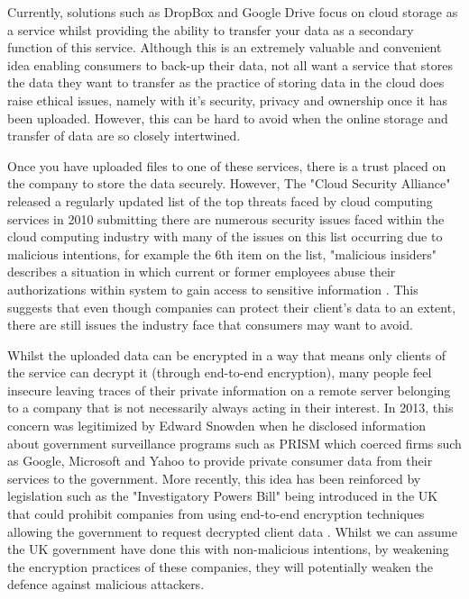 \documentclass[]{report}
\begin{document}
			Currently, solutions such as DropBox and Google Drive focus on cloud storage as a service whilst providing the ability to transfer your data as a secondary function of this service. Although this is an extremely valuable and convenient idea enabling consumers to back-up their data, not all want a service that stores the data they want to transfer as the practice of storing data in the cloud does raise ethical issues, namely with it's security, privacy and ownership once it has been uploaded. However, this can be hard to avoid when the online storage and transfer of data are so closely intertwined.
			
			Once you have uploaded files to one of these services, there is a trust placed on the company to store the data securely. However, The "Cloud Security Alliance" released a regularly updated list of the top threats faced by cloud computing services in 2010 submitting there are numerous security issues faced within the cloud computing industry with many of the issues on this list occurring due to malicious intentions, for example the 6th item on the list, "malicious insiders" describes a situation in which current or former employees abuse their authorizations within system to gain access to sensitive information \cite{CSA Top Threats}. This suggests that even though companies can protect their client's data to an extent, there are still issues the industry face that consumers may want to avoid.
		 
		 	Whilst the uploaded data can be encrypted in a way that means only clients of the service can decrypt it (through end-to-end encryption), many people feel insecure leaving traces of their private information on a remote server belonging to a company that is not necessarily always acting in their interest. In 2013, this concern was legitimized by Edward Snowden when he disclosed information about government surveillance programs such as PRISM which coerced firms such as Google, Microsoft and Yahoo to provide private consumer data from their services to the government.\cite{PRISM}  More recently, this idea has been reinforced by legislation such as the "Investigatory Powers Bill" being introduced in the UK that could prohibit companies from using end-to-end encryption techniques allowing the government to request decrypted client data \cite{IPB Encryption}. Whilst we can assume the UK government have done this with non-malicious intentions, by weakening the encryption practices of these companies, they will potentially weaken the defence against malicious attackers.
			
\end{document}
